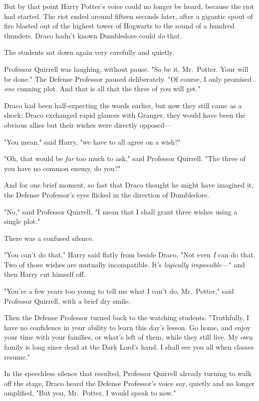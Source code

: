 But by that point Harry Potter's voice could no longer be heard, because the 
riot had started.
\sbreak
The riot ended around fifteen seconds later, after a gigantic spout of fire 
blasted out of the highest tower of Hogwarts to the sound of a hundred 
thunders. Draco hadn't known Dumbledore could \emph{do} that.

The students sat down again very carefully and quietly.

Professor Quirrell was laughing, without pause. "So be it, Mr.~Potter. Your 
will be done." The Defense Professor paused deliberately. "Of course, I only 
promised \emph{one} cunning plot. And that is all that the three of you will 
get."

Draco had been half-expecting the words earlier, but now they still came as a 
shock; Draco exchanged rapid glances with Granger, they would have been the 
obvious allies but their wishes were directly opposed---

"You mean," said Harry, "we have to all agree on a wish?"

"Oh, that would be \emph{far} too much to ask," said Professor Quirrell. "The 
three of you have no common enemy, do you?"

And for one brief moment, so fast that Draco thought he might have imagined it, 
the Defense Professor's eyes flicked in the direction of Dumbledore.

"No," said Professor Quirrell, "I mean that I shall grant three wishes using a 
single plot."

There was a confused silence.

"You can't do that," Harry said flatly from beside Draco. "Not even \emph{I} 
can do that. Two of those wishes are mutually incompatible. It's 
\emph{logically impossible---}" and then Harry cut himself off.

"You're a few years too young to tell me what I can't do, Mr.~Potter," said 
Professor Quirrell, with a brief dry smile.

Then the Defense Professor turned back to the watching students. "Truthfully, I 
have no confidence in your ability to learn this day's lesson. Go home, and 
enjoy your time with your families, or what's left of them, while they still 
live. My own family is long since dead at the Dark Lord's hand. I shall see you 
all when classes resume."

In the speechless silence that resulted, Professor Quirrell already turning to 
walk off the stage, Draco heard the Defense Professor's voice say, quietly and 
no longer amplified, "But you, Mr.~Potter, I would speak to now."